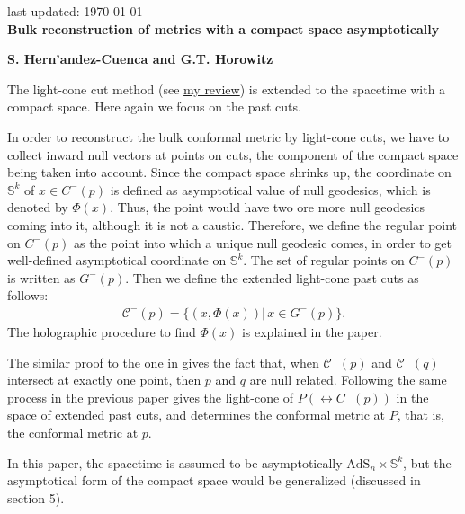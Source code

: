 \documentclass[12pt]{article}
\date{}
\begin{document}
{\Large{}
\hfill{\normalsize last updated: \today}
\\[2mm]
\textbf{Bulk reconstruction of metrics with a compact space asymptotically \cite{Hernandez-Cuenca:2020ppu}
}
}

\noindent
\hfill
\textbf{S. Hern'andez-Cuenca and G.T. Horowitz}%

\vspace{12pt}
The light-cone cut method \cite{Engelhardt:2016wgb} 
(see \href{https://albertmcc.github.io/web/reviews/light-cone1.pdf}{\color{blue}my review}) 
is extended to the spacetime with a compact space.
Here again we focus on the past cuts.

In order to reconstruct the bulk conformal metric by light-cone cuts, we have to collect inward null vectors at points on cuts,
the component of the compact space being taken into account.
Since the compact space shrinks up, the coordinate on $\mathbb S^k$ of $x \in C^-(p)$ 
is defined as asymptotical value of null geodesics, which is denoted by $\Phi(x)$.
Thus, the point would have two ore more null geodesics coming into it,
although it is not a caustic.
Therefore, we define the regular point on $C^-(p)$ as the point into which a unique null geodesic comes, 
in order to get well-defined asymptotical coordinate on $\mathbb S^k$.
The set of regular points on $C^-(p)$ is written as $G^-(p)$.
Then we define the extended light-cone past cuts as follows:
\begin{align}
	\mathcal C^-(p) = \{(x,\Phi(x))|\,x\in G^-(p)\}.
\end{align}
The holographic procedure to find $\Phi(x)$ is explained in the paper.

The similar proof to the one in \cite{Engelhardt:2016wgb} gives the fact that, 
when $\mathcal C^-(p)$ and $\mathcal C^-(q)$ intersect at exactly one point, then $p$ and $q$ are null related.
Following the same process in the previous paper gives the light-cone of $P (\leftrightarrow C^-(p))$ 
in the space of extended past cuts, and determines the conformal metric at $P$, that is, the conformal metric at $p$.

In this paper, the spacetime is assumed to be asymptotically $\mathrm{AdS}_n\times\mathbb S^k$,
but  the asymptotical form of the compact space would be generalized (discussed in section 5).



 

\end{document}
